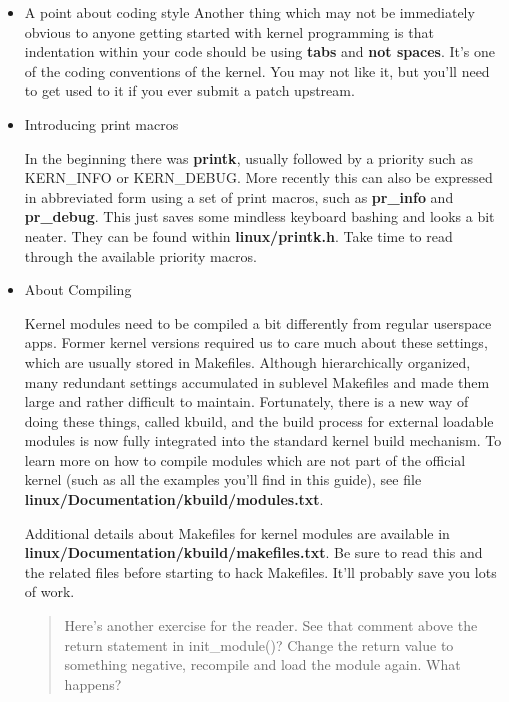 \documentclass[11pt]{article}
\begin{document}
\begin{itemize}
\item A point about coding style
\label{sec:orgba54241}
Another thing which may not be immediately obvious to anyone getting started with kernel programming is that indentation within your code should be using \textbf{tabs} and \textbf{not spaces}. It's one of the coding conventions of the kernel. You may not like it, but you'll need to get used to it if you ever submit a patch upstream.
\item Introducing print macros
\label{sec:org9331e15}

In the beginning there was \textbf{printk}, usually followed by a priority such as KERN\_INFO or KERN\_DEBUG. More recently this can also be expressed in abbreviated form using a set of print macros, such as \textbf{pr\_info} and \textbf{pr\_debug}. This just saves some mindless keyboard bashing and looks a bit neater. They can be found within \textbf{linux/printk.h}. Take time to read through the available priority macros.

\item About Compiling
\label{sec:orgf4767b0}

Kernel modules need to be compiled a bit differently from regular userspace apps. Former kernel versions required us to care much about these settings, which are usually stored in Makefiles. Although hierarchically organized, many redundant settings accumulated in sublevel Makefiles and made them large and rather difficult to maintain. Fortunately, there is a new way of doing these things, called kbuild, and the build process for external loadable modules is now fully integrated into the standard kernel build mechanism. To learn more on how to compile modules which are not part of the official kernel (such as all the examples you'll find in this guide), see file \textbf{linux/Documentation/kbuild/modules.txt}.

Additional details about Makefiles for kernel modules are available in \textbf{linux/Documentation/kbuild/makefiles.txt}. Be sure to read this and the related files before starting to hack Makefiles. It'll probably save you lots of work.

\begin{quote}
Here's another exercise for the reader. See that comment above the return statement in init\_module()? Change the return value to something negative, recompile and load the module again. What happens?
\end{quote}
\end{itemize}
\end{document}
